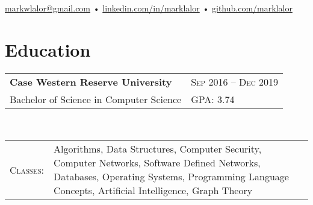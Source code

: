 \documentclass[a4paper,11pt]{article}
\begin{document}
\pagestyle{empty} %

\par{\par}
\begin{center}
\href{mailto:markwlalor@gmail.com}{markwlalor@gmail.com} • \href{https://linkedin.com/in/marklalor/}{linkedin.com/in/marklalor} • \href{http://github.com/marklalor}{github.com/marklalor}
\end{center}


\section{Education}
\begin{tabular}{lp{15cm}}
\textbf{Case Western Reserve University} & \textsc{Sep} 2016 -- \textsc{Dec} 2019 \\
Bachelor of Science in Computer Science &  \textsc{GPA}: 3.74\\
\end{tabular} \\
\begin{tabular}{rp{16cm}}
\textsc{Classes}: & Algorithms, Data Structures, Computer Security, Computer Networks, Software Defined Networks, Databases, Operating Systems, Programming Language Concepts, Artificial Intelligence, Graph Theory
\end{tabular}
\end{document}
